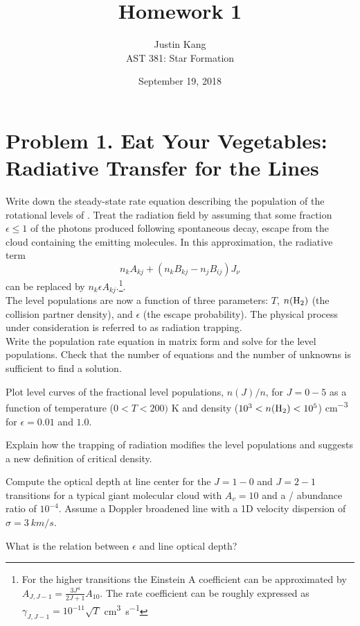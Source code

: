 \documentclass[11pt]{article}
\title{\vspace{-3em} \textbf{Homework 1}}
\author{Justin Kang \\ AST 381: Star Formation}
\date{\vspace{-0.75em} September 19, 2018}
\newenvironment{tight_enumerate}{
\begin{enumerate}[label=(\alph*)]
\setlength{\itemsep}{3pt}
\setlength{\parskip}{0pt}
}{\end{enumerate}}
\begin{document}
\maketitle
\singlespacing
{}


\vspace{-3em}
\section*{Problem 1. Eat Your Vegetables: Radiative Transfer for the  Lines}
\begin{tight_enumerate}
\item Write down the steady-state rate equation describing the population of the rotational levels of . Treat the radiation field by assuming that some fraction $\epsilon \leq 1$ of the photons produced following spontaneous decay, escape from the cloud containing the emitting molecules. In this approximation, the radiative term 
\[n_{k}A_{kj}+(n_{k}B_{kj}-n_{j}B_{ij})J_{\nu}\]
can be replaced by $n_{k}{\epsilon}A_{kj}.$\footnote{For the higher transitions the Einstein A coefficient can be approximated by $A_{J,J-1} = \frac{3J^{4}}{2J+1}A_{10}$. The rate coefficient can be roughly expressed as $\gamma_{J,J-1}=10^{-11}\sqrt{T}$ \si{cm^{3}s^{-1}}}.\\
\vspace{0em}\hspace{1em} The level populations are now a function of three parameters: $T$, $n(\ce{H2})$ (the collision partner density), and $\epsilon$ (the escape probability). The physical process under consideration is referred to as radiation trapping.\\
\vspace{0em}\hspace{1em} Write the population rate equation in matrix form and solve for the level populations. Check that the number of equations and the number of unknowns is sufficient to find a solution.
\item Plot level curves of the fractional level populations, $n(J)/n$, for $J = 0-5$ as a function of temperature ($0 < T < 200)$ \si{K} and  density ($10^{3} < n(\ce{H2}) < 10^{5}$) \si{cm^{-3}} for $\epsilon = 0.01$ and $1.0$.
\item Explain how the trapping of radiation modifies the level populations and suggests a new definition of critical density.
\item Compute the optical depth at line center for the  $J = 1-0$ and  $J = 2-1$ transitions for a typical giant molecular cloud with $A_{v} = 10$ and a / abundance ratio of $10^{-4}$. Assume a Doppler broadened line with a 1D velocity dispersion of $\sigma = 3\ \si{km/s}$.
\item What is the relation between $\epsilon$ and line optical depth?
\end{tight_enumerate}
\end{document}
